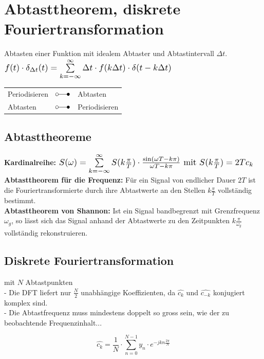 
\section{Abtasttheorem, diskrete Fouriertransformation}
	\begin{minipage}{12cm}
		Abtasten einer Funktion mit idealem Abtaster und Abtastintervall $\Delta t$.\\
		$ \scalebox{1.2}{$f(t) \cdot \delta_{\Delta t}(t) = \sum\limits_{k=-\infty}^{\infty} \Delta t \cdot f(k \Delta t) \cdot \delta(t-k \Delta t) $}$
	\end{minipage}
	\begin{minipage}{6cm}
		\begin{tabular}{|l l l|}
			\hline
				Periodisieren &$\laplace$ & Abtasten\\
				Abtasten & $\laplace$ & Periodisieren\\
			\hline
		\end{tabular}
	\end{minipage}

\subsection{Abtasttheoreme}
	\textbf{Kardinalreihe:}  $\scalebox{1.2}{$S(\omega) = \sum\limits_{k=-\infty}^{\infty} S(k\frac{\pi}{T}) \cdot \frac{\sin(\omega T - k\pi)}{\omega T - k\pi}$
	mit $S(k\frac{\pi}{T}) = 2Tc_k$}$\\

	\textbf{Abtasttheorem f\"ur die Frequenz:}
	F\"ur ein Signal von endlicher Dauer $2T$ ist die Fouriertransformierte durch ihre Abtastwerte an den Stellen $k\frac{\pi}{T}$
	vollst\"andig bestimmt. \\
	
	\textbf{Abtasttheorem von Shannon:}
	Ist ein Signal bandbegrenzt mit Grenzfrequenz $\omega_g$, so l\"asst sich das Signal anhand der Abtastwerte zu den Zeitpunkten
	$k\frac{\pi}{\omega_g}$ vollst\"andig rekonstruieren.
	
	
\subsection{Diskrete Fouriertransformation}
\begin{minipage}{14cm}
	mit $N$ Abtastpunkten\\
	-	Die DFT liefert nur $\frac{N}{2}$ unabh\"angige Koeffizienten, da $\hat{c_k}$ und $\hat{c_{-k}}$ konjugiert komplex sind.\\
	- Die Abtastfrequenz muss mindestens doppelt so gross sein, wie der zu beobachtende Frequenzinhalt...
\end{minipage}
\begin{minipage}{6cm}
	$$\hat{c_k} = \frac{1}{N} \cdot \sum\limits_{n=0}^{N-1} y_n \cdot e^{-jkn\frac{2\pi}{N}}$$
\end{minipage}
	
